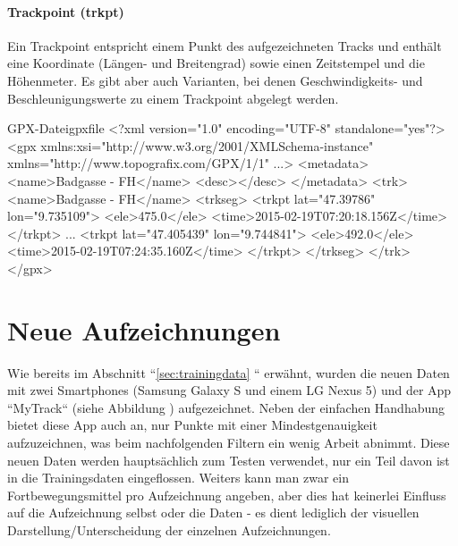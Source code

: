 \paragraph{Trackpoint (trkpt)}
Ein Trackpoint entspricht einem Punkt des aufgezeichneten Tracks und enthält eine Koordinate (Längen- und Breitengrad) sowie einen Zeitstempel und die Höhenmeter. Es gibt aber auch Varianten, bei denen Geschwindigkeits- und Beschleunigungswerte zu einem Trackpoint abgelegt werden. \cite{topografix_gpx_2004}
 
\begin{code}[xml]{GPX-Datei}{gpxfile}
<?xml version="1.0" encoding="UTF-8" standalone="yes"?>
<gpx xmlns:xsi="http://www.w3.org/2001/XMLSchema-instance" xmlns="http://www.topografix.com/GPX/1/1" ...>
    <metadata>
        <name>Badgasse - FH</name>
        <desc></desc>
    </metadata>
    <trk>
        <name>Badgasse - FH</name>
        <trkseg>
            <trkpt lat="47.39786" lon="9.735109">
                <ele>475.0</ele>
                <time>2015-02-19T07:20:18.156Z</time>
            </trkpt>
            ...
            <trkpt lat="47.405439" lon="9.744841">
                <ele>492.0</ele>
                <time>2015-02-19T07:24:35.160Z</time>
            </trkpt>
        </trkseg>
    </trk>
</gpx>
\end{code}
\clearpage

\section{Neue Aufzeichnungen}
Wie bereits im Abschnitt ``\ref{sec:trainingdata} `` erwähnt, wurden die neuen Daten mit zwei Smartphones (Samsung Galaxy S und einem LG Nexus 5) und der App ``MyTrack`` (siehe Abbildung ) aufgezeichnet. Neben der einfachen Handhabung bietet diese App auch an, nur Punkte mit einer Mindestgenauigkeit aufzuzeichnen, was beim nachfolgenden Filtern ein wenig Arbeit abnimmt. Diese neuen Daten werden hauptsächlich zum Testen verwendet, nur ein Teil davon ist in die Trainingsdaten eingeflossen. Weiters kann man zwar ein Fortbewegungsmittel pro Aufzeichnung angeben, aber dies hat keinerlei Einfluss auf die Aufzeichnung selbst oder die Daten - es dient lediglich der visuellen Darstellung/Unterscheidung der einzelnen Aufzeichnungen.



